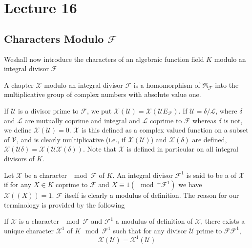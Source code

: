 \chapter{ Lecture 16}\label{chap16} %

\setcounter{section}{28}
\section{Characters Modulo \texorpdfstring{$\mathcal{F}$}{F}}\label{chap16:sec29}%

We\pageoriginale shall now introduce the characters of an algebraic function field
$K$ modulo an integral divisor $\mathcal{F}$ 
\begin{defi*}
  A chapter $\mathscr{X}$ modulo an integral divisor
    $\mathcal{F}$ is a homomorphism of $\mathfrak{R}_{\mathcal{F}}$ into
  the multiplicative group of complex numbers with absolute value one.   
\end{defi*}

If $\mathscr{U}$ is a divisor prime to $\mathcal{F}$, we put
$\mathcal{X} (\mathscr{U}) = \mathcal{X} (\mathscr{U} E
_{\mathcal{F}})$. If $\mathscr{U} = \delta / \mathscr{L}$, where $\delta$
and $\mathscr{L}$ are mutually coprime and integral and $\mathscr{L}$
coprime to $\mathcal{F}$ whereas $\delta$ is not, we define
$\mathcal{X} (\mathscr{U}) = 0$. $\mathcal{X}$ is this defined as a
complex valued function on a subset of $\mathscr{V}$, and is clearly
multiplicative (i.e., if $\mathcal{X} (\mathscr{U})$) and $\mathcal{X}
(\delta)$ are defined, $\mathcal{X} (\mathscr{U} \delta) = \mathcal{X}
(\mathscr{U} \mathcal{X} (\delta))$. Note that $\mathcal{X}$ is
defined in particular on all integral divisors of $K$. 

Let $\mathcal{X} $ be a character $\mod \mathcal{F}$ of $K$. An
integral divisor $\mathcal{F}^1$ is said to be a  of $\mathcal{X}$ if for any $X \in K$  coprime
to $\mathcal{F}$ and $X \equiv 1 (\mod ^+ \mathcal{F^1})$ we have
$\mathcal{X} ((X)) = 1$. $\mathcal{F}$ itself is clearly a modulus of
definition. The reason for our terminology is provided by the
following  
\begin{theorem*}
  If $\mathcal{X} $ is a character $\mod \mathcal{F}$ and
  $\mathcal{F}^1$ a modulus of definition of $\mathcal{X}$, there
  exists a unique  character $\mathcal{X}^1$ of $K \mod \mathcal{F}^1$
  such that for any divisor $\mathscr{U}$ prime to $\mathcal{F}
  \mathcal{F}^1$,  
  $$
  \mathcal{X} (\mathscr{U}) = \mathcal{X}^1 (\mathscr{U})
  $$
\end{theorem*}

